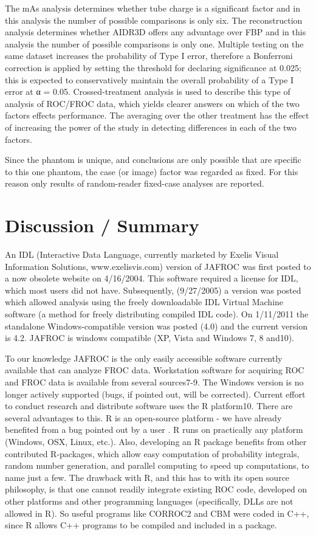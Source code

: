 \documentclass[
]{book}
\begin{document}
The mAs analysis determines whether tube charge is a significant factor and in this analysis the number of possible comparisons is only six. The reconstruction analysis determines whether AIDR3D offers any advantage over FBP and in this analysis the number of possible comparisons is only one. Multiple testing on the same dataset increases the probability of Type I error, therefore a Bonferroni correction is applied by setting the threshold for declaring significance at 0.025; this is expected to conservatively maintain the overall probability of a Type I error at α = 0.05. Crossed-treatment analysis is used to describe this type of analysis of ROC/FROC data, which yields clearer answers on which of the two factors effects performance. The averaging over the other treatment has the effect of increasing the power of the study in detecting differences in each of the two factors.

Since the phantom is unique, and conclusions are only possible that are specific to this one phantom, the case (or image) factor was regarded as fixed. For this reason only results of random-reader fixed-case analyses are reported.

\hypertarget{analyzing-froc-data-rjafroc-history}{%
\section{Discussion / Summary}\label{analyzing-froc-data-rjafroc-history}}

An IDL (Interactive Data Language, currently marketed by Exelis Visual Information Solutions, www.exelisvis.com) version of JAFROC was first posted to a now obsolete website on 4/16/2004. This software required a license for IDL, which most users did not have. Subsequently, (9/27/2005) a version was posted which allowed analysis using the freely downloadable IDL Virtual Machine software (a method for freely distributing compiled IDL code). On 1/11/2011 the standalone Windows-compatible version was posted (4.0) and the current version is 4.2. JAFROC is windows compatible (XP, Vista and Windows 7, 8 and10).

To our knowledge JAFROC is the only easily accessible software currently available that can analyze FROC data. Workstation software for acquiring ROC and FROC data is available from several sources7-9. The Windows version is no longer actively supported (bugs, if pointed out, will be corrected). Current effort to conduct research and distribute software uses the R platform10. There are several advantages to this. R is an open-source platform - we have already benefited from a bug pointed out by a user . R runs on practically any platform (Windows, OSX, Linux, etc.). Also, developing an R package benefits from other contributed R-packages, which allow easy computation of probability integrals, random number generation, and parallel computing to speed up computations, to name just a few. The drawback with R, and this has to with its open source philosophy, is that one cannot readily integrate existing ROC code, developed on other platforms and other programming languages (specifically, DLLs are not allowed in R). So useful programs like CORROC2 and CBM were coded in C++, since R allows C++ programs to be compiled and included in a package.
\end{document}
